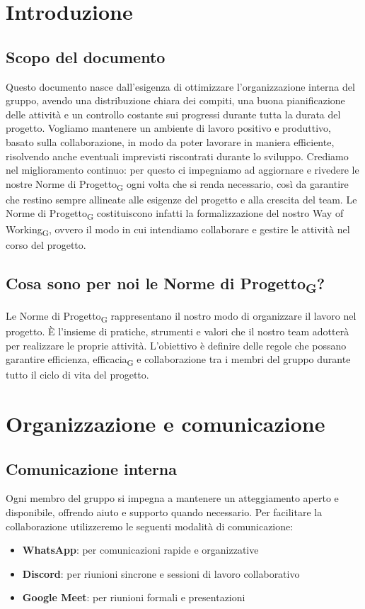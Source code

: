 \documentclass[11pt,a4paper]{article}
\newcommand{\gls}[1]{#1\textsubscript{G}}
\begin{document}
\newpage

\tableofcontents
\newpage

\section{Introduzione}
\subsection{Scopo del documento}
Questo documento nasce dall’esigenza di ottimizzare l’organizzazione interna del gruppo, avendo una distribuzione chiara dei compiti, una buona pianificazione delle attività e un controllo costante sui progressi durante tutta la durata del progetto. Vogliamo mantenere un ambiente di
lavoro positivo e produttivo, basato sulla collaborazione, in modo da poter lavorare in maniera efficiente, risolvendo anche eventuali imprevisti riscontrati durante lo sviluppo.
Crediamo nel miglioramento continuo: per questo ci impegniamo ad aggiornare e rivedere le nostre \gls{Norme di Progetto} ogni volta che si renda necessario, così da garantire che restino sempre allineate alle esigenze del progetto e alla crescita del team. Le \gls{Norme di Progetto} costituiscono infatti la formalizzazione del nostro \gls{Way of Working}, ovvero il modo in cui intendiamo collaborare e gestire le attività nel corso del progetto.

\subsection{Cosa sono per noi le \gls{Norme di Progetto}?}
Le \gls{Norme di Progetto} rappresentano il nostro modo di organizzare il lavoro nel progetto. È l’insieme di pratiche, strumenti e valori che il nostro team adotterà per realizzare le proprie attività. L’obiettivo è definire delle regole che possano garantire efficienza, \gls{efficacia} e collaborazione tra i membri del gruppo durante tutto il ciclo di vita del progetto.

\newpage

\section{Organizzazione e comunicazione}

\subsection{Comunicazione interna}
Ogni membro del gruppo si impegna a mantenere un atteggiamento aperto e disponibile, offrendo aiuto e supporto quando necessario. Per facilitare la collaborazione utilizzeremo le seguenti modalità di comunicazione:
\begin{itemize}
    \item \textbf{WhatsApp}: per comunicazioni rapide e organizzative
    \item \textbf{Discord}: per riunioni sincrone e sessioni di lavoro collaborativo
    \item \textbf{Google Meet}: per riunioni formali e presentazioni
\end{itemize}
\end{document}
